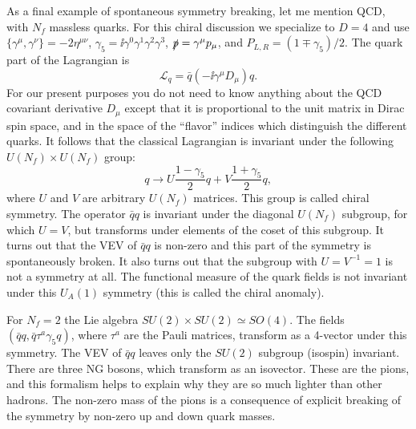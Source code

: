 As a final example of spontaneous symmetry breaking, let me mention QCD, with
$N_f$ massless quarks. For this chiral discussion we specialize to $D=4$ and
use $\{\gamma^\mu,\gamma^\nu\}=-2\eta^{\mu\nu}$,
$\gamma_5=\ii\gamma^0\gamma^1\gamma^2\gamma^3$,
$\slashed p=\gamma^\mu p_\mu$, and $P_{L,R}=(1\mp\gamma_5)/2$. The quark
part of the Lagrangian is
\begin{equation*}
  \mathcal L_q=\bar q(-\ii\gamma^\mu D_\mu)q.
\end{equation*}
For our present purposes you do not need to know anything about the QCD
covariant derivative $D_\mu$ except that it is proportional to the unit matrix
in Dirac spin space, and in the space of the ``flavor'' indices which
distinguish the different quarks. It follows that the classical Lagrangian is
invariant under the following $U(N_f)\times U(N_f)$ group:
\begin{equation*}
  q\longrightarrow U\frac{1-\gamma_5}{2}q
  +V\frac{1+\gamma_5}{2}q,
\end{equation*}
where $U$ and $V$ are arbitrary $U(N_f)$ matrices. This group is called chiral
symmetry. The operator $\bar qq$ is invariant under the diagonal $U(N_f)$
subgroup, for which $U=V$, but transforms under elements of the coset of this
subgroup. It turns out that the VEV of $\bar qq$ is non-zero and this part of
the symmetry is spontaneously broken. It also turns out that the subgroup with
$U=V^{-1}=1$ is not a symmetry at all. The functional measure of the quark
fields is not invariant under this $U_A(1)$ symmetry (this is called the chiral
anomaly).

For $N_f=2$ the Lie algebra $SU(2)\times SU(2)\simeq SO(4)$. The fields
$(\bar qq,\bar q\tau^a\gamma_5q)$, where $\tau^a$ are the Pauli matrices,
transform as a 4-vector under this symmetry. The VEV of $\bar qq$ leaves only
the $SU(2)$ subgroup (isospin) invariant. There are three NG bosons, which
transform as an isovector. These are the pions, and this formalism helps to
explain why they are so much lighter than other hadrons. The non-zero mass of
the pions is a consequence of explicit breaking of the symmetry by non-zero up
and down quark masses.
